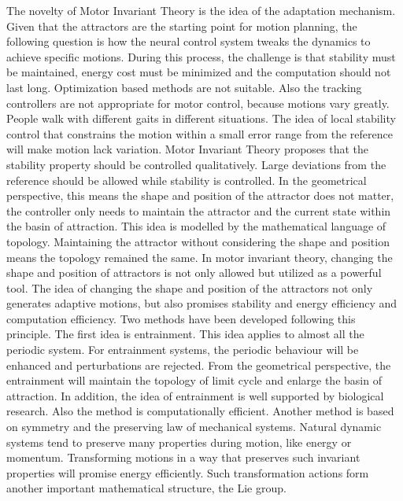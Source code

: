 The novelty of Motor Invariant Theory is the idea of the adaptation mechanism. 
Given that the attractors are the starting point for motion planning, the following question is how the neural control system tweaks the dynamics to achieve specific motions. 
During this process, the challenge is that stability must be maintained, energy cost must be minimized and the computation should not last long. 
Optimization based methods are not suitable.  
Also the tracking controllers are not appropriate for motor control, because motions vary greatly.
People walk with different gaits in different situations. 
The idea of local stability control that constrains the motion within a small error range from the reference will make motion lack variation.  Motor Invariant Theory proposes that the stability property should be controlled qualitatively. 
Large deviations from the reference should be allowed while stability is controlled. 
In the geometrical perspective, this means the shape and position of the attractor does not matter, the controller only needs to maintain the attractor and the current state within the basin of attraction. 
This idea is modelled by the mathematical language of topology. 
Maintaining the attractor without considering the shape and position means  the topology remained the same. 
In motor invariant theory, changing the shape and position of attractors is not only allowed but utilized as a powerful tool.  
The idea of changing the shape and position of the attractors not only generates adaptive motions, but also promises stability and energy efficiency and computation efficiency. 
Two methods have been developed following this principle. 
The first idea is entrainment. 
This idea applies to almost all the periodic system. 
For entrainment systems, the periodic behaviour will be enhanced and perturbations are rejected. 
From the geometrical perspective, the entrainment will maintain the topology of limit cycle and enlarge the basin of attraction. 
In addition, the idea of entrainment is well supported by biological research.  
Also the method is computationally efficient.
Another method is based on symmetry and the preserving law of mechanical systems. 
Natural dynamic systems tend to preserve many properties during motion, like energy or momentum. 
Transforming motions in a way that preserves such invariant properties will promise energy efficiently.
Such transformation actions form another important mathematical structure, the Lie group.


